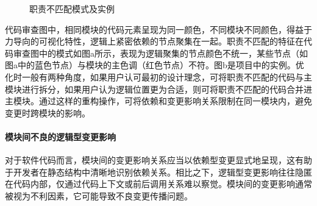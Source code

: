\begin{figure}[!h]
    \setlength{\subfigcapskip}{-1bp}
    \centering
    \begin{minipage}{\textwidth}
    \centering
    \hspace{2em}
    \end{minipage}
    \vspace{0.2em}
    \caption{职责不匹配模式及实例} %
\end{figure}

代码审查图中，相同模块的代码元素呈现为同一颜色，不同模块不同颜色，得益于力导向的可视化特性，逻辑上紧密依赖的节点聚集在一起。职责不匹配的特征在代码审查图中的模式如图a所示，表现为逻辑聚集的节点颜色不统一，某些节点（如图a中的蓝色节点）与模块的主色调（红色节点）不符。图b是项目中的实例。优化时一般有两种角度，如果用户认可最初的设计理念，可将职责不匹配的代码与主模块进行拆分，如果用户认为逻辑位置更为合适，则可将职责不匹配的代码合并进主模块。通过这样的重构操作，可将依赖和变更影响关系限制在同一模块内，避免变更时跨模块的影响。

\paragraph{模块间不良的逻辑型变更影响} 对于软件代码而言，模块间的变更影响关系应当以依赖型变更显式地呈现，这有助于开发者在静态结构中清晰地识别依赖关系。相比之下，逻辑型变更影响往往隐匿在代码内部，仅通过代码上下文或前后调用关系难以察觉。模块间的变更影响通常被视为不利因素，它可能导致不良变更传播问题。

